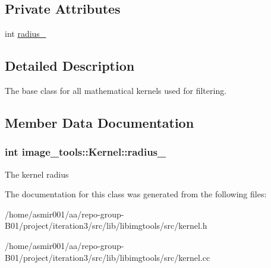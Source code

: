 \subsection*{Private Attributes}
\begin{DoxyCompactItemize}
\item 
int \hyperlink{classimage__tools_1_1Kernel_a75493a8e73d0217897d83da1ad30cc82}{radius\+\_\+}
\end{DoxyCompactItemize}


\subsection{Detailed Description}
The base class for all mathematical kernels used for filtering. 

\subsection{Member Data Documentation}
\subsubsection[{\texorpdfstring{radius\+\_\+}{radius_}}]{\setlength{\rightskip}{0pt plus 5cm}int image\+\_\+tools\+::\+Kernel\+::radius\+\_\+\hspace{0.3cm}{\ttfamily [private]}}\hypertarget{classimage__tools_1_1Kernel_a75493a8e73d0217897d83da1ad30cc82}{}\label{classimage__tools_1_1Kernel_a75493a8e73d0217897d83da1ad30cc82}
The kernel radius 

The documentation for this class was generated from the following files\+:\begin{DoxyCompactItemize}
\item 
/home/asmir001/aa/repo-\/group-\/\+B01/project/iteration3/src/lib/libimgtools/src/kernel.\+h\item 
/home/asmir001/aa/repo-\/group-\/\+B01/project/iteration3/src/lib/libimgtools/src/kernel.\+cc\end{DoxyCompactItemize}
